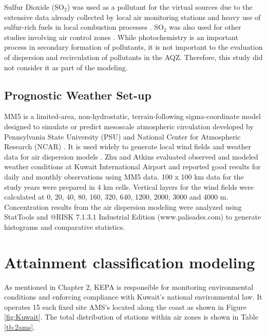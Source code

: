 Sulfur Dioxide (SO$_{2}$) was used as a pollutant for the virtual sources due to the extensive data already collected by local air monitoring stations and heavy use of sulfur-rich fuels in local combustion processes \citep{Al-Awadhi2014, Al-Rashidi2005}.  SO$_{2}$ was also used for other studies involving air control zones \citep{Hao2000, Henschel2013, Pereira2007}.  While photochemistry is an important process in secondary formation of pollutants, it is not important to the evaluation of dispersion and recirculation of pollutants in the AQZ.  Therefore, this study did not consider it as part of the modeling. 

\subsection{Prognostic Weather Set-up}

MM5 is a limited-area, non-hydrostatic, terrain-following sigma-coordinate model designed to simulate or predict mesoscale atmospheric circulation developed by Pennsylvania State University (PSU) and National Center for Atmospheric Research (NCAR) \citep{Grell1994}.  It is used widely to generate local wind fields and weather data for air dispersion models \citep{Ghannam2013a, Lee2009, Tsai2011, Zhu2004}.  Zhu and Atkins evaluated observed and modeled weather conditions at Kuwait International Airport and reported good results for daily and monthly observations using MM5 data.  100 x 100 km data for the study years were prepared in 4 km cells. Vertical layers for the wind fields were calculated at 0, 20, 40, 80, 160, 320, 640, 1200, 2000, 3000 and 4000 m. Concentration results from the air dispersion modeling were analyzed using StatTools and @RISK 7.1.3.1 Industrial Edition (www.palisades.com) to generate histograms and comparative statistics. 
\clearpage
\section{Attainment classification modeling}

As mentioned in Chapter 2, KEPA is responsible for monitoring environmental conditions and enforcing compliance with Kuwait's national environmental law. It operates 15 each fixed site AMS’s located along the coast as shown in Figure \ref{fig:Kuwait}.  The total distribution of stations within air zones is shown in Table \ref{tb:2ams}. 

